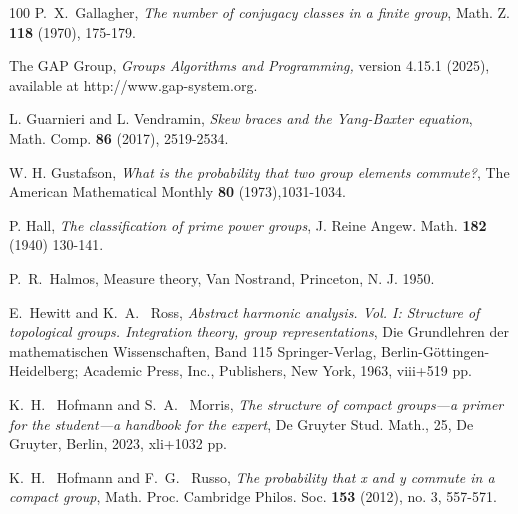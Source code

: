 \documentclass[oneside]{amsart}
\numberwithin{equation}{section}
\theoremstyle{plain}
\theoremstyle{definition}
\begin{document}
\begin{thebibliography}{100}
P.~X.~Gallagher, \emph{ The number of conjugacy classes in a finite group}, Math. Z. {\bf 118} (1970), 175-179.
 
The GAP Group, \emph{Groups Algorithms and Programming,}  version 4.15.1 (2025), available at  http://www.gap-system.org.

 L. Guarnieri  and  L. Vendramin, \emph{ Skew braces and the Yang-Baxter equation},  Math. Comp. {\bf 86} (2017), 2519-2534.



W. H. Gustafson,  \emph{What is the probability that two group elements commute?}, The American Mathematical Monthly {\bf 80} (1973),1031-1034.
	
P. Hall, \emph{The classification of prime power groups}, J. Reine Angew. Math. {\bf 182}  (1940) 130-141.	

P.~R.~Halmos, Measure theory, Van Nostrand, Princeton, N. J. 1950.

E.~Hewitt and K.~A.~ Ross, \emph{Abstract harmonic analysis. Vol. I: Structure of topological groups. Integration theory, group representations}, Die Grundlehren der mathematischen Wissenschaften, Band 115
Springer-Verlag, Berlin-Göttingen-Heidelberg; Academic Press, Inc., Publishers, New York, 1963, viii+519 pp.

K.~H.~ Hofmann and S.~A.~ Morris, \emph{The structure of compact groups—a primer for the student—a handbook for the expert}, De Gruyter Stud. Math., 25, De Gruyter, Berlin, 2023, xli+1032 pp.

K.~H.~ Hofmann and F.~G.~ Russo, \emph{The probability that  x  and  y  commute in a compact group}, Math. Proc. Cambridge Philos. Soc. {\bf 153} (2012), no. 3, 557-571.

	

\end{thebibliography}
\end{document}
